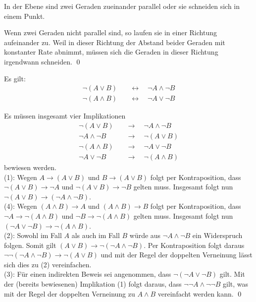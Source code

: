 \begin{bsp}
  In der Ebene sind zwei Geraden zueinander parallel oder sie schneiden sich in einem Punkt.
 \end{bsp}
 \begin{bew}
Wenn zwei Geraden nicht parallel sind, so laufen sie in einer Richtung aufeinander zu. Weil in dieser Richtung der Abstand beider Geraden mit konstanter Rate abnimmt, müssen sich die Geraden in dieser Richtung irgendwann schneiden. \qed
 \end{bew}



 \begin{sat} \label{demorgan}
Es gilt:
 \begin{align*}
  \neg (A\lor B) \quad& \leftrightarrow\quad \neg A\land \neg B \\
  \neg(A\land B) \quad& \leftrightarrow\quad \neg A\lor \neg B
 \end{align*}
 \end{sat}
 \begin{bew}[(*)]
Es müssen insgesamt vier Implikationen
\begin{align}
 \neg (A\lor B) \quad& \to\quad \neg A\land \neg B \tag{1}\\
 \neg A\land \neg B\quad& \to\quad  \neg (A\lor B) \tag{2}\\
  \neg(A\land B) \quad& \to \quad \neg A\lor \neg B \tag{3}\\
  \neg A\lor \neg B \quad& \to \quad \neg(A\land B) \tag{4}
\end{align}
bewiesen werden. \\[0.5em]
(1): Wegen $A\to (A\lor B)$ und $B\to (A\lor B)$ folgt per Kontraposition, dass $\neg (A\lor B)\to \neg A$ und $\neg(A\lor B) \to \neg B$ gelten muss. Insgesamt folgt nun $\neg(A\lor B)\to( \neg A\land\neg B)$. \\[0.5em]
(4): Wegen $(A\land B)\to A$ und $(A\land B) \to B$ folgt per Kontraposition, dass $\neg A\to \neg(A\land B)$ und $\neg B\to \neg(A\land B)$ gelten muss. Insgesamt folgt nun $(\neg A\lor \neg B)\to \neg(A\land B)$. \\[0.5em]
(2): Sowohl im Fall $A$ als auch im Fall $B$ würde aus $\neg A\land \neg B$ ein Widerspruch folgen. Somit gilt $(A\lor B)\to \neg (\neg A\land \neg B)$. Per Kontraposition folgt daraus $\neg\neg(\neg A\land \neg B) \to \neg(A\lor B)$ und mit der Regel der doppelten Verneinung lässt sich dies zu (2) vereinfachen. \\[0.5em]
(3): Für einen indirekten Beweis sei angenommen, dass $\neg (\neg A\lor\neg B)$ gilt. Mit der (bereits bewiesenen) Implikation (1) folgt daraus, dass $\neg\neg A\land\neg\neg B$ gilt, was mit der Regel der doppelten Verneinung zu $A\land B$ vereinfacht werden kann. \qed
 \end{bew}

